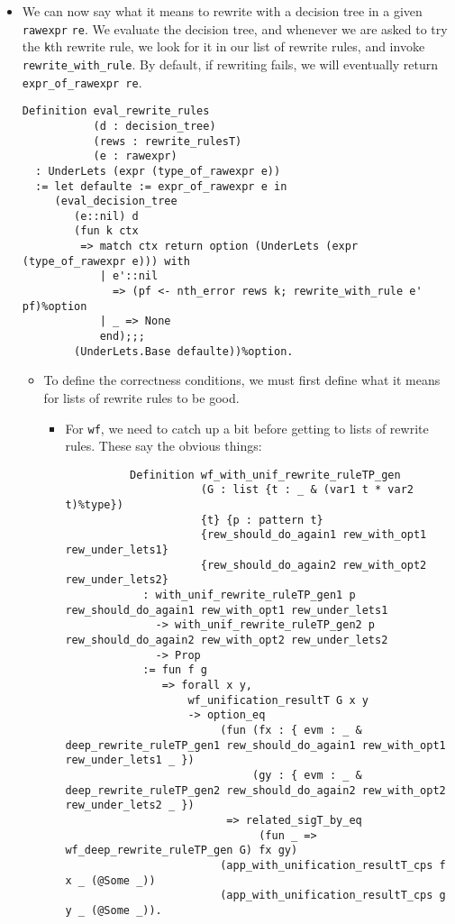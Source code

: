 \begin{itemize}
\item
  We can now say what it means to rewrite with a decision tree in a
  given \texttt{rawexpr} \texttt{re}. We evaluate the decision tree, and
  whenever we are asked to try the \texttt{k}th rewrite rule, we look
  for it in our list of rewrite rules, and invoke
  \texttt{rewrite\_with\_rule}. By default, if rewriting fails, we will
  eventually return \texttt{expr\_of\_rawexpr\ re}.

\begin{verbatim}
Definition eval_rewrite_rules
           (d : decision_tree)
           (rews : rewrite_rulesT)
           (e : rawexpr)
  : UnderLets (expr (type_of_rawexpr e))
  := let defaulte := expr_of_rawexpr e in
     (eval_decision_tree
        (e::nil) d
        (fun k ctx
         => match ctx return option (UnderLets (expr (type_of_rawexpr e))) with
            | e'::nil
              => (pf <- nth_error rews k; rewrite_with_rule e' pf)%option
            | _ => None
            end);;;
        (UnderLets.Base defaulte))%option.
\end{verbatim}

  \begin{itemize}
  \tightlist
  \item
    To define the correctness conditions, we must first define what it
    means for lists of rewrite rules to be good.

    \begin{itemize}
    \item
      For \texttt{wf}, we need to catch up a bit before getting to lists
      of rewrite rules. These say the obvious things:

\begin{verbatim}
          Definition wf_with_unif_rewrite_ruleTP_gen
                     (G : list {t : _ & (var1 t * var2 t)%type})
                     {t} {p : pattern t}
                     {rew_should_do_again1 rew_with_opt1 rew_under_lets1}
                     {rew_should_do_again2 rew_with_opt2 rew_under_lets2}
            : with_unif_rewrite_ruleTP_gen1 p rew_should_do_again1 rew_with_opt1 rew_under_lets1
              -> with_unif_rewrite_ruleTP_gen2 p rew_should_do_again2 rew_with_opt2 rew_under_lets2
              -> Prop
            := fun f g
               => forall x y,
                   wf_unification_resultT G x y
                   -> option_eq
                        (fun (fx : { evm : _ & deep_rewrite_ruleTP_gen1 rew_should_do_again1 rew_with_opt1 rew_under_lets1 _ })
                             (gy : { evm : _ & deep_rewrite_ruleTP_gen2 rew_should_do_again2 rew_with_opt2 rew_under_lets2 _ })
                         => related_sigT_by_eq
                              (fun _ => wf_deep_rewrite_ruleTP_gen G) fx gy)
                        (app_with_unification_resultT_cps f x _ (@Some _))
                        (app_with_unification_resultT_cps g y _ (@Some _)).


\end{verbatim}
\end{itemize}
\end{itemize}
\end{itemize}
